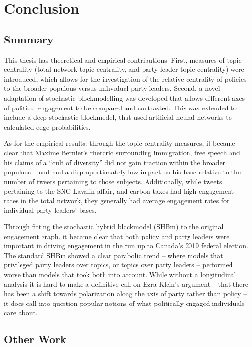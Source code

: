 \chapter{Conclusion}\label{ch:Conclusion}

\section{Summary}

This thesis has theoretical and empirical contributions. First, measures of
topic centrality (total network topic centrality, and party leader topic
centrality) were introduced, which allows for the investigation of the relative
centrality of policies to the broader populous versus individual party leaders.
Second, a novel adaptation of stochastic blockmodelling was developed that
allows different axes of political engagement to be compared and contrasted.
This was extended to include a deep stochastic blockmodel, that used artificial
neural networks to calculated edge probabilities. 

As for the empirical results: through the topic centrality measures, it became
clear that Maxime Bernier's rhetoric surrounding immigration, free speech and
his claims of a ``cult of diversity'' did not gain traction within the broader
populous -- and had a disproportionately low impact on his base relative to the
number of tweets pertaining to those subjects. Additionally, while tweets
pertaining to the SNC Lavalin affair, and carbon taxes had high engagement rates
in the total network, they generally had average engagement rates for individual
party leaders' bases. 

Through fitting the stochastic hybrid blockmodel (SHBm) to the original
engagement graph, it became clear that both policy and party leaders were
important in driving engagement in the run up to Canada's 2019 federal election.
The standard SHBm showed a clear parabolic trend -- where models that privileged
party leaders over topics, or topics over party leaders -- performed worse than
models that took both into account. While without a longitudinal analysis it is
hard to make a definitive call on Ezra Klein's argument -- that there has been a
shift towards polarization along the axis of party rather than policy -- it does
call into question popular notions of what politically engaged individuals care
about. 

\section{Other Work}

